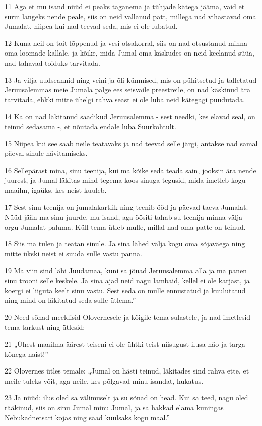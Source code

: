 \par 11 Aga et mu isand nüüd ei peaks taganema ja tühjade kätega jääma, vaid et surm langeks nende peale, siis on neid vallanud patt, millega nad vihastavad oma Jumalat, niipea kui nad teevad seda, mis ei ole lubatud.
\par 12 Kuna neil on toit lõppenud ja vesi otsakorral, siis on nad otsustanud minna oma loomade kallale, ja kõike, mida Jumal oma käskudes on neid keelanud süüa, nad tahavad toiduks tarvitada.
\par 13 Ja vilja uudseannid ning veini ja õli kümnised, mis on pühitsetud ja talletatud Jeruusalemmas meie Jumala palge ees seisvaile preestreile, on nad käskinud ära tarvitada, ehkki mitte ühelgi rahva seast ei ole luba neid kätegagi puudutada.
\par 14 Ka on nad läkitanud saadikud Jeruusalemma - sest needki, kes elavad seal, on teinud sedasama -, et nõutada endale luba Suurkohtult.
\par 15 Niipea kui see saab neile teatavaks ja nad teevad selle järgi, antakse nad samal päeval sinule hävitamiseks.
\par 16 Sellepärast mina, sinu teenija, kui ma kõike seda teada sain, jooksin ära nende juurest, ja Jumal läkitas mind tegema koos sinuga tegusid, mida imetleb kogu maailm, igaüks, kes neist kuuleb.
\par 17 Sest sinu teenija on jumalakartlik ning teenib ööd ja päevad taeva Jumalat. Nüüd jään ma sinu juurde, mu isand, aga öösiti tahab su teenija minna välja orgu Jumalat paluma. Küll tema ütleb mulle, millal nad oma patte on teinud.
\par 18 Siis ma tulen ja teatan sinule. Ja sina lähed välja kogu oma sõjaväega ning mitte ükski neist ei suuda sulle vastu panna.
\par 19 Ma viin sind läbi Juudamaa, kuni sa jõuad Jeruusalemma alla ja ma panen sinu trooni selle keskele. Ja sina ajad neid nagu lambaid, kellel ei ole karjast, ja koergi ei liiguta keelt sinu vastu. Sest seda on mulle ennustatud ja kuulutatud ning mind on läkitatud seda sulle ütlema.”
\par 20 Need sõnad meeldisid Olovernesele ja kõigile tema sulastele, ja nad imetlesid tema tarkust ning ütlesid:
\par 21 „Ühest maailma äärest teiseni ei ole ühtki teist niisugust ilusa näo ja targa kõnega naist!”
\par 22 Olovernes ütles temale: „Jumal on hästi teinud, läkitades sind rahva ette, et meile tuleks võit, aga neile, kes põlgavad minu isandat, hukatus.
\par 23 Ja nüüd: ilus oled sa välimuselt ja su sõnad on head. Kui sa teed, nagu oled rääkinud, siis on sinu Jumal minu Jumal, ja sa hakkad elama kuningas Nebukadnetsari kojas ning saad kuulsaks kogu maal.”


